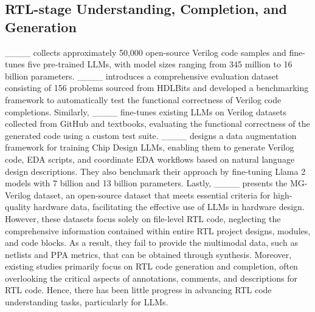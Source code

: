 

\subsection{RTL-stage Understanding, Completion, and Generation}
____ collects approximately 50,000 open-source Verilog code samples and fine-tunes five pre-trained LLMs, with model sizes ranging from 345 million to 16 billion parameters. ____ introduces a comprehensive evaluation dataset consisting of 156 problems sourced from HDLBits and developed a benchmarking framework to automatically test the functional correctness of Verilog code completions. Similarly, ____ fine-tunes existing LLMs on Verilog datasets collected from GitHub and textbooks, evaluating the functional correctness of the generated code using a custom test suite. ____ designs a data augmentation framework for training Chip Design LLMs, enabling them to generate Verilog code, EDA scripts, and coordinate EDA workflows based on natural language design descriptions. They also benchmark their approach by fine-tuning Llama 2 models with 7 billion and 13 billion parameters. Lastly, ____ presents the MG-Verilog dataset, an open-source dataset that meets essential criteria for high-quality hardware data, facilitating the effective use of LLMs in hardware design. However, these datasets focus solely on file-level RTL code, neglecting the comprehensive information contained within entire RTL project designs, modules, and code blocks. As a result, they fail to provide the multimodal data, such as netlists and PPA metrics, that can be obtained through synthesis. 
Moreover, existing studies primarily focus on RTL code generation and completion, often overlooking the critical aspects of annotations, comments, and descriptions for RTL code. Hence, there has been little progress in advancing RTL code understanding tasks, particularly for LLMs.


